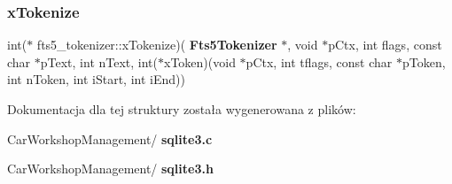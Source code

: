 \mbox{\label{structfts5__tokenizer_aca859d7c328ff545aef9a16c07a70ed4}} 
\subsubsection{xTokenize}
{\footnotesize\ttfamily int($\ast$ fts5\+\_\+tokenizer\+::x\+Tokenize)(\textbf{ Fts5\+Tokenizer} $\ast$, void $\ast$p\+Ctx, int flags, const char $\ast$p\+Text, int n\+Text, int($\ast$x\+Token)(void $\ast$p\+Ctx, int tflags, const char $\ast$p\+Token, int n\+Token, int i\+Start, int i\+End))}



Dokumentacja dla tej struktury została wygenerowana z plików\+:\begin{DoxyCompactItemize}
\item 
Car\+Workshop\+Management/\textbf{ sqlite3.\+c}\item 
Car\+Workshop\+Management/\textbf{ sqlite3.\+h}\end{DoxyCompactItemize}
